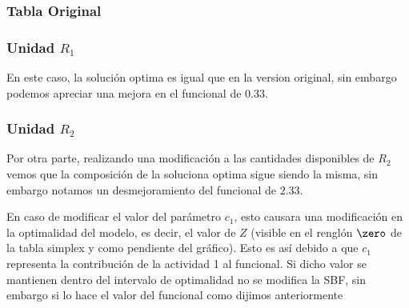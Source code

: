 

\begin{homeworkProblem}[-1][Modelo \RN{1}]
\subsubsection{Tabla Original}
\subsubsection{Unidad $R_1$}
En este caso, la solución optima es igual que en la version original, sin embargo podemos apreciar una mejora en el funcional de $0.33$.
\subsubsection{Unidad $R_2$}
Por otra parte, realizando una modificación a las cantidades disponibles de $R_2$ vemos que la composición de la soluciona optima sigue siendo la misma, sin embargo notamos un desmejoramiento del funcional de $2.33$. 
\end{homeworkProblem}

\begin{homeworkProblem}[-1][Modelo \RN{2}]
En caso de modificar el valor del parámetro $c_1$, esto causara una modificación en la optimalidad del modelo, es decir, el valor de $Z$ (visible en el renglón $\zero$ de la tabla simplex y como pendiente del gráfico).
Esto es así debido a que $c_1$ representa la contribución de la actividad 1 al funcional. Si dicho valor se mantienen dentro del intervalo de optimalidad no se modifica la SBF, sin embargo si lo hace el valor del funcional como dijimos anteriormente
\end{homeworkProblem}

